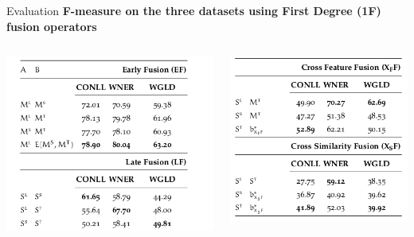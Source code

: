\documentclass[10pt,xcolor=table]{beamer}
\begin{document}
\begin{frame}[t]{Evaluation}
\textbf{F-measure on the three datasets using First Degree (1F)  fusion operators}
\vspace{1cm}
\begin{columns}
\begin{minipage}[c][0.5\textheight][c]{\linewidth}
\includegraphics[width=1\linewidth]{image2/Chapitre4/1F_1.png}
\end{minipage}
\begin{minipage}[c][0.5\textheight][c]{\linewidth}
\includegraphics[width=1\linewidth]{image2/Chapitre4/1f_2.png}
\end{minipage}
\end{columns}

\vspace{\textheight}
\end{frame}
\end{document}
